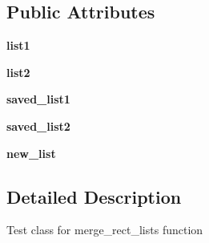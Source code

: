 \subsection*{\-Public \-Attributes}
\begin{DoxyCompactItemize}
\item 
\hypertarget{classinterface_1_1test__utils_1_1_merge_rect_list_test_case_a9a97c20e92306870fd1088790a50694b}{{\bfseries list1}}\label{classinterface_1_1test__utils_1_1_merge_rect_list_test_case_a9a97c20e92306870fd1088790a50694b}

\item 
\hypertarget{classinterface_1_1test__utils_1_1_merge_rect_list_test_case_a663d70c7a34e91ed9ffc332a7fbf9263}{{\bfseries list2}}\label{classinterface_1_1test__utils_1_1_merge_rect_list_test_case_a663d70c7a34e91ed9ffc332a7fbf9263}

\item 
\hypertarget{classinterface_1_1test__utils_1_1_merge_rect_list_test_case_af0e8734d0380ee8ab9ec94c3a47fc98d}{{\bfseries saved\-\_\-list1}}\label{classinterface_1_1test__utils_1_1_merge_rect_list_test_case_af0e8734d0380ee8ab9ec94c3a47fc98d}

\item 
\hypertarget{classinterface_1_1test__utils_1_1_merge_rect_list_test_case_a5c348ecb90c96a1d8d4d171b28ff195a}{{\bfseries saved\-\_\-list2}}\label{classinterface_1_1test__utils_1_1_merge_rect_list_test_case_a5c348ecb90c96a1d8d4d171b28ff195a}

\item 
\hypertarget{classinterface_1_1test__utils_1_1_merge_rect_list_test_case_afc1492384ce495617181467975c0e0e2}{{\bfseries new\-\_\-list}}\label{classinterface_1_1test__utils_1_1_merge_rect_list_test_case_afc1492384ce495617181467975c0e0e2}

\end{DoxyCompactItemize}


\subsection{\-Detailed \-Description}
\begin{DoxyVerb}Test class for merge_rect_lists function \end{DoxyVerb}
 

